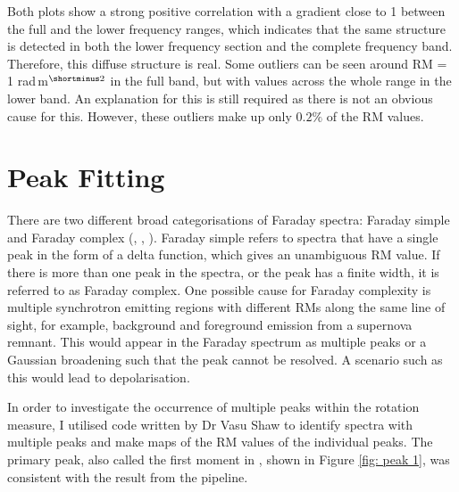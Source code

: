 Both plots show a strong positive correlation with a gradient close to 1 between the full and the lower frequency ranges, which indicates that the same structure is detected in both the lower frequency section and the complete frequency band. Therefore, this diffuse structure is real. Some outliers can be seen around RM = 1 rad$\,$m$^{\shortminus2}$ in the full band, but with values across the whole range in the lower band. An explanation for this is still required as there is not an obvious cause for this. However, these outliers make up only $0.2\%$ of the RM values.


\section{Peak Fitting}

There are two different broad categorisations of Faraday spectra: Faraday simple and Faraday complex (\cite{Alger_Livingston_McClure-Griffiths_Nabaglo_Wong_Ong_2021}, \cite{thomson2023rapidaskapcontinuumsurvey}, \cite{vanderwoude2024prototypefaradayrotationmeasure}). Faraday simple refers to spectra that have a single peak in the form of a delta function, which gives an unambiguous RM value. If there is more than one peak in the spectra, or the peak has a finite width, it is referred to as Faraday complex. One possible cause for Faraday complexity is multiple synchrotron emitting regions with different RMs along the same line of sight, for example, background and foreground emission from a supernova remnant. This would appear in the Faraday spectrum as multiple peaks or a Gaussian broadening such that the peak cannot be resolved. A scenario such as this would lead to depolarisation. 

In order to investigate the occurrence of multiple peaks within the rotation measure, I utilised code written by Dr Vasu Shaw
to identify spectra with multiple peaks and make maps of the RM values of the individual peaks. 
The primary peak, also called the first moment in \cite{Dickey_2019}, shown in Figure \ref{fig: peak 1}, was consistent with the result from the pipeline.

